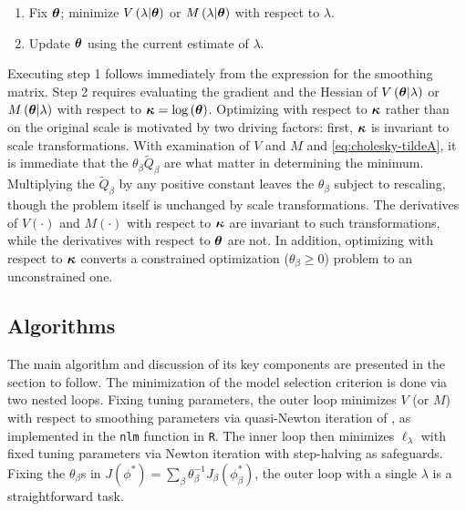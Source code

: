 \documentclass[12pt]{article}
\newcommand{\bfkappa}{\mbox{\boldmath $\kappa$}}
\newcommand{\tildeQ}{\tilde{Q}}
\newcommand{\bftheta}{\mbox{\boldmath $\theta$}}
\theoremstyle{definition}
\begin{document}
\begin{enumerate}
\item Fix $\bftheta$; minimize $V\left(\lambda \vert \bftheta\right)$ or $M\left(\lambda \vert \bftheta\right)$ with respect to $\lambda$.
\item Update $\bftheta$ using the current estimate of $\lambda$.
\end{enumerate}
\noindent
Executing step 1 follows immediately from the expression for the smoothing matrix. Step 2 requires evaluating the gradient and the Hessian of $V\left( \bftheta \vert \lambda \right)$ or $M\left(\bftheta \vert \lambda\right)$ with respect to $\bfkappa = \log\left(\bftheta\right)$. Optimizing with respect to $\bfkappa$ rather than on the original scale is motivated by two driving factors: first, $\bfkappa$ is invariant to scale transformations. With examination of $V$ and $M$ and \ref{eq:cholesky-tildeA}, it is immediate that the $\theta_\beta \tildeQ_\beta$ are what matter in determining the minimum. Multiplying the $\tildeQ_\beta$ by any positive constant leaves the $\theta_\beta$ subject to rescaling, though the problem itself is unchanged by scale transformations. The derivatives of $V\left(\cdot\right)$ and $M\left(\cdot\right)$ with respect to $\bfkappa$ are invariant to such transformations, while the derivatives with respect to $\bftheta$ are not. In addition, optimizing with respect to $\bfkappa$ converts a constrained optimization ($\theta_\beta \ge 0$) problem to an unconstrained one.

\subsection{Algorithms}

The main algorithm and discussion of its key components are presented in the section to follow. The minimization of the model selection criterion is done via two nested loops. Fixing tuning parameters, the outer loop minimizes $V$ (or $M$) with respect to smoothing parameters via quasi-Newton iteration of \citet{dennis1996numerical}, as implemented in the \texttt{nlm} function in \texttt{R}. The inner loop then minimizes $\ell_\lambda$ with fixed tuning parameters via Newton iteration with step-halving as safeguards. Fixing the $\theta_\beta$s in $J \left(\phi^*\right) = \sum_\beta \theta^{-1}_\beta J_\beta \left(\phi_\beta^*\right)$, the outer loop with a single $\lambda$ is a straightforward task. 
\end{document}

